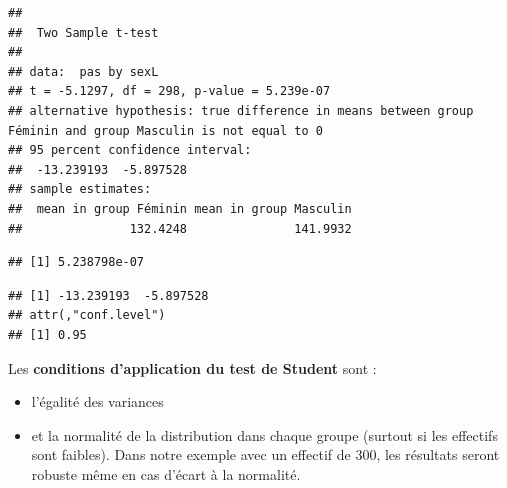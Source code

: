 \documentclass[
]{book}
\newenvironment{Shaded}{\begin{snugshade}}{\end{snugshade}}
\newcommand{\CommentTok}[1]{\textcolor[rgb]{0.56,0.35,0.01}{\textit{#1}}}
\newcommand{\DocumentationTok}[1]{\textcolor[rgb]{0.56,0.35,0.01}{\textbf{\textit{#1}}}}
\newcommand{\NormalTok}[1]{#1}
\newcommand{\SpecialCharTok}[1]{\textcolor[rgb]{0.81,0.36,0.00}{\textbf{#1}}}
\providecommand{\tightlist}{%
  \setlength{\itemsep}{0pt}\setlength{\parskip}{0pt}}
\begin{document}
\begin{verbatim}
## 
##  Two Sample t-test
## 
## data:  pas by sexL
## t = -5.1297, df = 298, p-value = 5.239e-07
## alternative hypothesis: true difference in means between group Féminin and group Masculin is not equal to 0
## 95 percent confidence interval:
##  -13.239193  -5.897528
## sample estimates:
##  mean in group Féminin mean in group Masculin 
##               132.4248               141.9932
\end{verbatim}

\begin{Shaded}
\end{Shaded}

\begin{verbatim}
## [1] 5.238798e-07
\end{verbatim}

\begin{Shaded}
\end{Shaded}

\begin{verbatim}
## [1] -13.239193  -5.897528
## attr(,"conf.level")
## [1] 0.95
\end{verbatim}

Les \textbf{conditions d'application du test de Student} sont :

\begin{itemize}
\tightlist
\item
  l'égalité des variances
\item
  et la normalité de la distribution dans chaque groupe (surtout si les effectifs sont faibles). Dans notre exemple avec un effectif de 300, les résultats seront robuste même en cas d'écart à la normalité.
\end{itemize}
\end{document}
